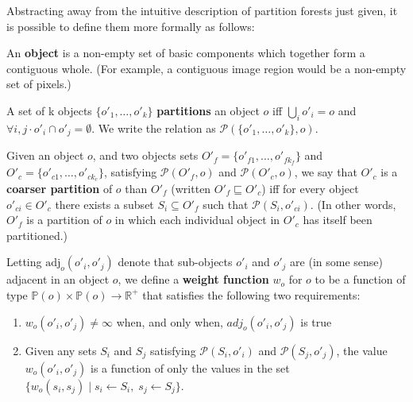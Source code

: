 Abstracting away from the intuitive description of partition forests just given, it is possible to define them more formally as follows:

\begin{definition}
An \textbf{object} is a non-empty set of basic components which together form a contiguous whole. (For example, a contiguous image region would be a non-empty set of pixels.)
\end{definition}

\begin{definition}
A set of k objects $\{o'_1,\ldots,o'_k\}$ \textbf{partitions} an object $o$ iff $\bigcup_i o'_i = o$ and $\forall i,j \cdot o'_i \cap o'_j = \emptyset$. We write the relation as $\mathcal{P}(\{o'_1,\ldots,o'_k\}, o)$.
\end{definition}

\begin{definition}
Given an object $o$, and two objects sets $O'_f = \{o'_{f1},\ldots,o'_{fk_f}\}$ and $O'_c = \{o'_{c1},\ldots,o'_{ck_c}\}$, satisfying $\mathcal{P}(O'_f,o)$ and $\mathcal{P}(O'_c,o)$, we say that $O'_c$ is a \textbf{coarser partition} of $o$ than $O'_f$ (written $O'_f \sqsubseteq O'_c$) iff for every object $o'_{ci} \in O'_c$ there exists a subset $S_i \subseteq O'_f$ such that $\mathcal{P}(S_i,o'_{ci})$. (In other words, $O'_f$ is a partition of $o$ in which each individual object in $O'_c$ has itself been partitioned.)
\end{definition}

\begin{definition}
Letting $\mbox{adj}_o(o'_i, o'_j)$ denote that sub-objects $o'_i$ and $o'_j$ are (in some sense) adjacent in an object $o$, we define a \textbf{weight function} $w_o$ for $o$ to be a function of type $\mathbb{P}(o) \times \mathbb{P}(o) \to \mathbb{R}^+$ that satisfies the following two requirements:
%
\begin{enumerate}

\item $w_o(o'_i, o'_j) \ne \infty$ when, and only when, $adj_o(o'_i, o'_j)$ is true

\item Given any sets $S_i$ and $S_j$ satisfying $\mathcal{P}(S_i,o'_i)$ and $\mathcal{P}(S_j,o'_j)$, the value $w_o(o'_i, o'_j)$ is a function of only the values in the set $\{w_o(s_i, s_j) \; | \; s_i \leftarrow S_i, \; s_j \leftarrow S_j\}$.

\end{enumerate}

\end{definition}

